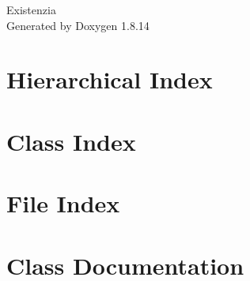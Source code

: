 \documentclass[twoside]{book}
\newcommand{\+}{\discretionary{\mbox{\scriptsize$\hookleftarrow$}}{}{}}
\newcommand{\clearemptydoublepage}{%
  \newpage{\pagestyle{empty}\cleardoublepage}%
}
\begin{document}
\hypersetup{pageanchor=false,
             bookmarksnumbered=true,
             pdfencoding=unicode
            }
\begin{titlepage}
\vspace*{7cm}
\begin{center}%
{\Large Existenzia }\\
\vspace*{1cm}
{\large Generated by Doxygen 1.8.14}\\
\end{center}
\end{titlepage}
\clearemptydoublepage
{}
\tableofcontents
\clearemptydoublepage
{}
\hypersetup{pageanchor=true}

\chapter{Hierarchical Index}

\chapter{Class Index}

\chapter{File Index}

\chapter{Class Documentation}











































\end{document}
